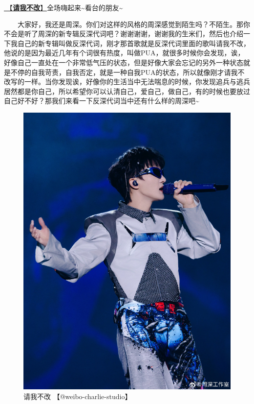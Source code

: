 \documentclass[]{ctexbook}
\begin{document}
\hyperref[brave-heart]{🎵【\textbf{请我不改}】}全场嗨起来\textasciitilde 看台的朋友\textasciitilde{}

  大家好，我还是周深。你们对这样的风格的周深感觉到陌生吗？不陌生。那你不会是听了周深的新专辑反深代词吧？谢谢谢谢，谢谢我的生米们，然后也介绍一下我自己的新专辑叫做反深代词，刚才那首歌就是反深代词里面的歌叫请我不改，他说的是因为最近几年有个词很有热度，叫做PUA，就很多时候你会发现，诶，好像自己一直处在一个非常低气压的状态，但是好像大家会忘记的另外一种状态就是不停的自我苛责，自我否定，就是一种自我PUA的状态，所以就像刚才请我不改写的一样。当你发现诶，好像你的生活当中无法喘息的时候，你发现追兵与逃兵居然都是你自己，所以希望你可以认清自己，爱自己，做自己，有的时候也要放过自己好不好？那我们来看一下反深代词当中还有什么样的周深吧\textasciitilde{}

\begin{figure}

{\centering \includegraphics[width=400pt]{img/beijing20240922/002} 

}

\caption{请我不改 【@weibo-charlie-studio】}\label{fig:unnamed-chunk-106}
\end{figure}
\end{document}
